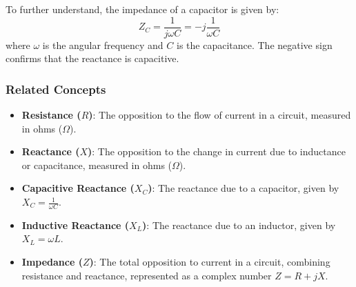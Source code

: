 To further understand, the impedance of a capacitor is given by:
\[
Z_C = \frac{1}{j\omega C} = -j\frac{1}{\omega C}
\]
where \(\omega\) is the angular frequency and \(C\) is the capacitance. The negative sign confirms that the reactance is capacitive.

\subsubsection{Related Concepts}
\begin{itemize}
    \item \textbf{Resistance (\(R\))}: The opposition to the flow of current in a circuit, measured in ohms ($\Omega$).
    \item \textbf{Reactance (\(X\))}: The opposition to the change in current due to inductance or capacitance, measured in ohms ($\Omega$).
    \item \textbf{Capacitive Reactance (\(X_C\))}: The reactance due to a capacitor, given by \(X_C = \frac{1}{\omega C}\).
    \item \textbf{Inductive Reactance (\(X_L\))}: The reactance due to an inductor, given by \(X_L = \omega L\).
    \item \textbf{Impedance (\(Z\))}: The total opposition to current in a circuit, combining resistance and reactance, represented as a complex number \(Z = R + jX\).
\end{itemize}

